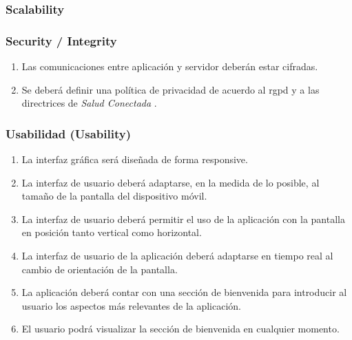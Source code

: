         \subsubsection{Scalability}
        \subsubsection{Security / Integrity}
            \begin{enumerate}[resume, label=\textbf{\texttt{RNF-\arabic*}}]
                \item \label{req:no_funcionales:cifrado_comunicaciones} Las comunicaciones entre aplicación y servidor deberán estar cifradas.
                \item \label{req:no_funcionales:politica_privacidad} Se deberá definir una política de privacidad de acuerdo al \gls{rgpd} \cite{publications_office_of_the_european_union_reglamento_nodate} y a las directrices de \textit{Salud Conectada} \cite{google_preguntas_nodate}.
            \end{enumerate}
        \subsubsection{Usabilidad (Usability)}
            \begin{enumerate}[resume, label=\textbf{\texttt{RNF-\arabic*}}]
                \item \label{req:no_funcionales:ui_responsive} La interfaz gráfica será diseñada de forma \gls{responsive}.
                \item \label{req:no_funcionales:ui_tamanio_pantalla} La interfaz de usuario deberá adaptarse, en la medida de lo posible, al tamaño de la pantalla del dispositivo móvil.
                \item \label{req:no_funcionales:ui_orientacion_soporte} La interfaz de usuario deberá permitir el uso de la aplicación con la pantalla en posición tanto vertical como horizontal.
                \item \label{req:no_funcionales:ui_orientacion_dinamica} La interfaz de usuario de la aplicación deberá adaptarse en tiempo real al cambio de orientación de la pantalla.
                \item \label{req:no_funcionales:bienvenida} La aplicación deberá contar con una sección de bienvenida para introducir al usuario los aspectos más relevantes de la aplicación.
                \item \label{req:no_funcionales:bienvenida_demanda} El usuario podrá visualizar la sección de bienvenida en cualquier momento.
            \end{enumerate}
            
